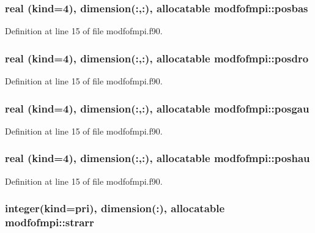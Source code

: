 \hypertarget{classmodfofmpi_abd8afe0852ff1d0298955d285cb4f001}{
\subsubsection[{posbas}]{\setlength{\rightskip}{0pt plus 5cm}real (kind=4), dimension(\-:,\-:), allocatable modfofmpi\-::posbas}}\label{classmodfofmpi_abd8afe0852ff1d0298955d285cb4f001}


Definition at line 15 of file modfofmpi.\-f90.

\hypertarget{classmodfofmpi_a1ca3754d2490a28a6596589818c19aba}{
\subsubsection[{posdro}]{\setlength{\rightskip}{0pt plus 5cm}real (kind=4), dimension(\-:,\-:), allocatable modfofmpi\-::posdro}}\label{classmodfofmpi_a1ca3754d2490a28a6596589818c19aba}


Definition at line 15 of file modfofmpi.\-f90.

\hypertarget{classmodfofmpi_a420a314f84492aec68a773c09730981d}{
\subsubsection[{posgau}]{\setlength{\rightskip}{0pt plus 5cm}real (kind=4), dimension(\-:,\-:), allocatable modfofmpi\-::posgau}}\label{classmodfofmpi_a420a314f84492aec68a773c09730981d}


Definition at line 15 of file modfofmpi.\-f90.

\hypertarget{classmodfofmpi_a940b15087397a154e933785ff862d1aa}{
\subsubsection[{poshau}]{\setlength{\rightskip}{0pt plus 5cm}real (kind=4), dimension(\-:,\-:), allocatable modfofmpi\-::poshau}}\label{classmodfofmpi_a940b15087397a154e933785ff862d1aa}


Definition at line 15 of file modfofmpi.\-f90.

\hypertarget{classmodfofmpi_adc11b8c24e402c222ddf9d339aece63c}{
\subsubsection[{strarr}]{\setlength{\rightskip}{0pt plus 5cm}integer(kind=pri), dimension(\-:), allocatable modfofmpi\-::strarr}}\label{classmodfofmpi_adc11b8c24e402c222ddf9d339aece63c}


